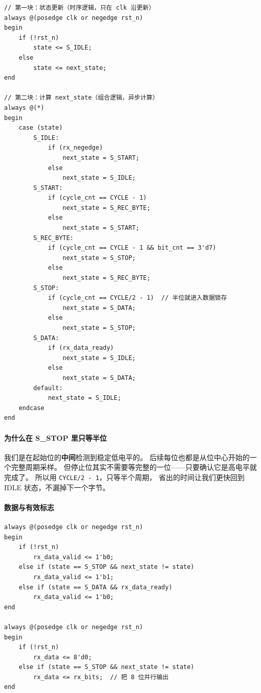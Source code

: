 \begin{lstlisting}[style=verilog]
// 第一块：状态更新（时序逻辑，只在 clk 沿更新）
always @(posedge clk or negedge rst_n)
begin
    if (!rst_n)
        state <= S_IDLE;
    else
        state <= next_state;
end

// 第二块：计算 next_state（组合逻辑，异步计算）
always @(*)
begin
    case (state)
        S_IDLE:
            if (rx_negedge)
                next_state = S_START;
            else
                next_state = S_IDLE;
        S_START:
            if (cycle_cnt == CYCLE - 1)
                next_state = S_REC_BYTE;
            else
                next_state = S_START;
        S_REC_BYTE:
            if (cycle_cnt == CYCLE - 1 && bit_cnt == 3'd7)
                next_state = S_STOP;
            else
                next_state = S_REC_BYTE;
        S_STOP:
            if (cycle_cnt == CYCLE/2 - 1)  // 半位就进入数据锁存
                next_state = S_DATA;
            else
                next_state = S_STOP;
        S_DATA:
            if (rx_data_ready)
                next_state = S_IDLE;
            else
                next_state = S_DATA;
        default:
            next_state = S_IDLE;
    endcase
end
\end{lstlisting}

\paragraph{为什么在 S\_STOP 里只等半位}
我们是在起始位的\textbf{中间}检测到稳定低电平的。
后续每位也都是从位中心开始的一个完整周期采样。
但停止位其实不需要等完整的一位——只要确认它是高电平就完成了。
所以用 \texttt{CYCLE/2 - 1}，只等半个周期，
省出的时间让我们更快回到 IDLE 状态，不漏掉下一个字节。

\paragraph{数据与有效标志}

\begin{lstlisting}[style=verilog]
always @(posedge clk or negedge rst_n)
begin
    if (!rst_n)
        rx_data_valid <= 1'b0;
    else if (state == S_STOP && next_state != state)
        rx_data_valid <= 1'b1;
    else if (state == S_DATA && rx_data_ready)
        rx_data_valid <= 1'b0;
end

always @(posedge clk or negedge rst_n)
begin
    if (!rst_n)
        rx_data <= 8'd0;
    else if (state == S_STOP && next_state != state)
        rx_data <= rx_bits;  // 把 8 位并行输出
end
\end{lstlisting}

